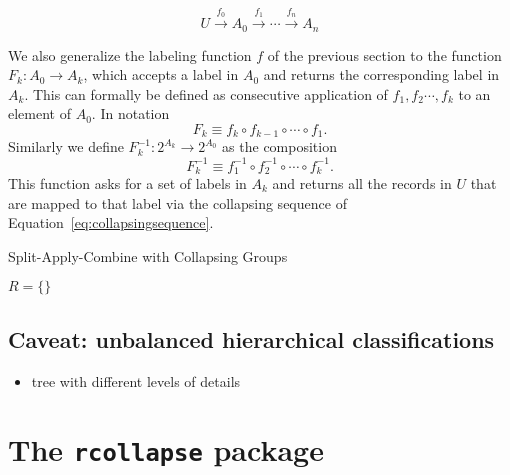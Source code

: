 \documentclass[11pt, fleqn]{article}
\begin{document}
\begin{equation}
U\xrightarrow{f_0}A_0\xrightarrow{f_1}\cdots\xrightarrow{f_n}A_n
\label{eq:collapsingsequence}
\end{equation}

We also generalize the labeling function $f$ of the previous section
to the function $F_k:A_0\to A_k$, which accepts a label in $A_0$ and 
returns the corresponding label in $A_k$. This can formally be defined 
as consecutive application of $f_1, f_2\cdots, f_k$ to an element of 
$A_0$. In notation
\begin{equation*}
F_k \equiv f_k\circ f_{k-1}\circ\cdots\circ f_1.
\end{equation*}
Similarly we define $F^{-1}_k:2^{A_k}\to 2^{A_0}$ as the composition
\begin{equation*}
F_k^{-1} \equiv f_1^{-1}\circ f_2^{-1}\circ\cdots\circ f_k^{-1}.
\end{equation*}
This function asks for a set of labels in $A_k$ and returns all the records in
$U$ that are mapped to that label via the collapsing sequence of
Equation~\eqref{eq:collapsingsequence}. 






\begin{algorithm}[H]
\caption{Split-Apply-Combine with Collapsing Groups}


$R = \{\}$\;

\end{algorithm}

\subsection{Caveat: unbalanced hierarchical classifications}
\begin{itemize}
\item tree with different levels of details
\end{itemize}

\section{The \texttt{rcollapse} package}





\end{document}
